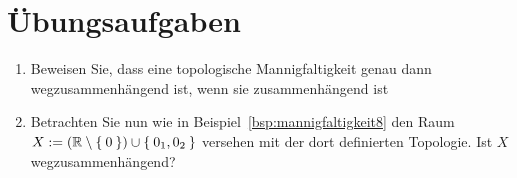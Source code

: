 \clearpage
\section*{Übungsaufgaben}

\begin{aufgabe}[Zusammenhang]\label{ub4:aufg1}
    \begin{enumerate}[label=(\alph*)]
        \item Beweisen Sie, dass eine topologische Mannigfaltigkeit
              genau dann wegzusammenhängend ist, wenn sie zusammenhängend
              ist
        \item Betrachten Sie nun wie in Beispiel~\ref{bsp:mannigfaltigkeit8}
              den Raum $X:= (\mathbb{R} \setminus \Set{0}) \cup \Set{0_1, 0_2}$
              versehen mit der dort definierten Topologie. Ist $X$
              wegzusammenhängend?
    \end{enumerate}
\end{aufgabe}
